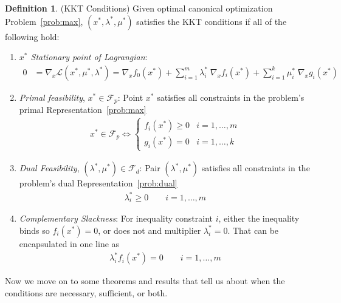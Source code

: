 \documentclass[12pt]{article}
\numberwithin{equation}{section} %
\theoremstyle{plain}
\theoremstyle{definition}
\newtheorem{defn}[thm]{Definition}
\theoremstyle{remark}
\newcommand{\sL}{\mathscr{L}}
\begin{document}

\begin{defn}{(KKT Conditions)}
Given optimal canonical optimization Problem~\ref{prob:max},
$(x^*,\lambda^*,\mu^*)$ satisfies the KKT conditions if all of the
following hold:
\begin{enumerate}
  \item \emph{$x^*$ Stationary point of Lagrangian}:
    \begin{align*}
      0 &= \nabla_x \sL(x^*,\mu^*,\lambda^*)
        = \nabla_x f_0(x^*)
        + \sum^m_{i=1} \lambda_i^* \; \nabla_x f_i(x^*)
        + \sum^k_{i=1} \mu_i^* \; \nabla_xg_i(x^*)
    \end{align*}
  \item \emph{Primal feasibility}, $x^*\in \mathscr{F}_p$:
    Point $x^*$ satisfies all constraints in the problem's primal
    Representation~\ref{prob:max}
    \begin{align*}
      x^*\in \mathscr{F}_p
      \iff
      \begin{cases}
        f_i(x^*)\geq 0 & i = 1,\ldots,m\\
        g_i(x^*)= 0 & i = 1,\ldots,k
      \end{cases}
    \end{align*}

  \item \emph{Dual Feasibility}, $(\lambda^*,\mu^*)\in\mathscr{F}_d$:
    Pair $(\lambda^*,\mu^*)$ satisfies all constraints in the problem's
    dual Representation~\ref{prob:dual}
    \begin{align*}
      \lambda^*_i \geq 0
      \qquad i=1,\ldots,m
    \end{align*}

  \item \emph{Complementary Slackness}:
    For inequality constraint $i$, either the inequality binds so
    $f_i(x^*)=0$, or does not and multiplier $\lambda^*_i=0$.
    That can be encapsulated in one line as
    \begin{align}
      \label{kkt:slackness}
      \lambda_i^* f_i(x^*) =0
      \qquad i=1,\ldots,m
    \end{align}
\end{enumerate}
Now we move on to some theorems and results that tell us about when the
conditions are necessary, sufficient, or both.
\end{defn}
\end{document}
